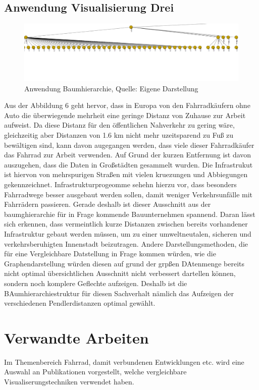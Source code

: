 \documentclass[usegeometry=true]{scrartcl}
\begin{document}
\subsection{Anwendung Visualisierung Drei}
\begin{figure}[h]
\begin{center}
\includegraphics[width=16cm]{Bilder/BaumhierarchieA3.png}
\caption{Anwendung Baumhierarchie, Quelle: Eigene Darstellung}
\end{center}
\end{figure}
Aus der Abbildung 6 geht hervor, dass in Europa von den Fahrradkäufern ohne Auto die überwiegende mehrheit eine geringe Distanz von Zuhause zur Arbeit aufweist. Da diese Distanz für den öffentlichen Nahverkehr zu gering wäre, gleichzeitig aber Distanzen von 1.6 km nicht mehr uzeitsparend zu Fuß zu bewältigen sind, kann davon augegangen werden, dass viele dieser Fahrradkäufer das Fahrrad zur Arbeit verwenden. Auf Grund der kurzen Entfernung ist davon auszugehen, dass die Daten in Großstädten gesammelt wurden. Die Infrastrukut ist hiervon von mehrspurigen Straßen mit vielen kruezungen und Abbiegungen gekennzeichnet. Infrastrukturprogeomme sehehn hierzu vor, dass besonders Fahrradwege besser ausgebaut werden sollen, damit weniger Verkehrsunfälle mit Fahrrädern passieren. Gerade deshalb ist dieser Ausschnitt aus der baumghierarchie für in Frage kommende Bauunternehmen spannend. Daran lässt sich erkennen, dass vermeintlich kurze Distanzen zwischen bereits vorhandener Infrastruktur gebaut werden müssen, um zu einer umweltneutalen, sicheren und verkehrsberuhigten Innenstadt beizutragen. 
Andere Darstellungsmethoden, die für eine Vergleichbare Datstellung in Frage kommen würden, wie die Graphendarstellung würden diesen auf grund der grpßen DAtenmenge bereits nicht optimal übersichtlichen Ausschnitt nicht verbessert dartellen können, sondern noch komplere Geflechte aufzeigen. Deshalb ist die BAumhierarchiestruktur für diesen Sachverhalt nämlich das Aufzeigen der verschiedenen Pendlerdistanzen optimal gewählt. 
\section{Verwandte Arbeiten}
Im Themenbereich Fahrrad, damit verbundenen Entwicklungen etc. wird eine Auswahl an Publikationen vorgestellt, welche vergleichbare Visualiserungstechniken verwendet haben. 
\end{document}
